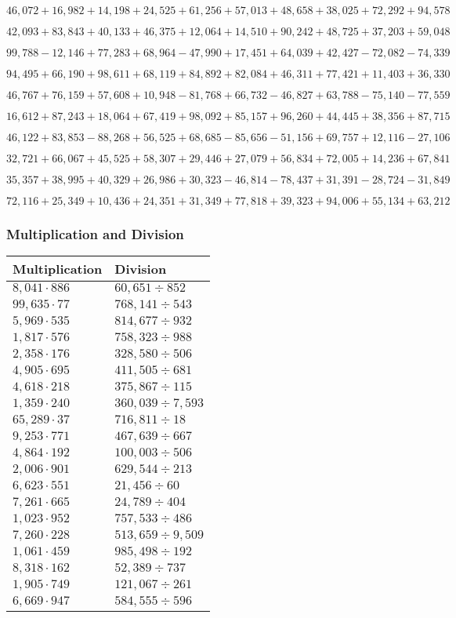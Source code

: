 \(46,072+16,982+14,198+24,525+61,256+57,013+48,658+38,025+72,292+ 94,578\)

\(42,093+83,843+40,133+46,375+12,064+14,510+90,242+48,725+37,203+59,048\)

\(99,788-12,146+77,283+68,964-47,990+17,451+64,039+42,427-72,082-74,339\)

\(94,495+66,190+98,611+68,119+84,892+82,084+46,311+77,421+11,403+36,330\)

\(46,767+76,159+57,608+10,948-81,768+66,732-46,827+63,788-75,140-77,559\)

\(16,612+87,243+18,064+67,419+98,092+85,157+96,260+44,445+38,356+87,715\)

\(46,122+83,853-88,268+56,525+68,685-85,656-51,156+69,757+12,116-27,106\)

\(32,721+66,067+45,525+58,307+29,446+27,079+56,834+72,005+14,236+67,841\)

\(35,357+38,995+40,329+26,986+30,323-46,814-78,437+31,391-28,724-31,849\)

\(72,116+25,349+10,436+24,351+31,349+77,818+39,323+94,006+55,134+63,212\)

\hypertarget{multiplication-and-division-223}{%
\subsubsection{Multiplication and
Division}\label{multiplication-and-division-223}}

\begin{longtable}[]{@{}ll@{}}
\toprule
Multiplication & Division\tabularnewline
\midrule
\endhead
\(8,041\cdot886\) & \(60,651÷852\)\tabularnewline
\(99,635\cdot77\) & \(768,141÷543\)\tabularnewline
\(5,969\cdot535\) & \(814,677÷932\)\tabularnewline
\(1,817\cdot576\) & \(758,323÷988\)\tabularnewline
\(2,358\cdot176\) & \(328,580÷506\)\tabularnewline
\(4,905\cdot695\) & \(411,505÷681\)\tabularnewline
\(4,618\cdot218\) & \(375,867÷115\)\tabularnewline
\(1,359\cdot240\) & \(360,039÷7,593\)\tabularnewline
\(65,289\cdot37\) & \(716,811÷18\)\tabularnewline
\(9,253\cdot771\) & \(467,639÷667\)\tabularnewline
\(4,864\cdot192\) & \(100,003÷506\)\tabularnewline
\(2,006\cdot901\) & \(629,544÷213\)\tabularnewline
\(6,623\cdot551\) & \(21,456÷60\)\tabularnewline
\(7,261\cdot665\) & \(24,789÷404\)\tabularnewline
\(1,023\cdot952\) & \(757,533÷486\)\tabularnewline
\(7,260\cdot228\) & \(513,659÷9,509\)\tabularnewline
\(1,061\cdot459\) & \(985,498÷192\)\tabularnewline
\(8,318\cdot162\) & \(52,389÷737\)\tabularnewline
\(1,905\cdot749\) & \(121,067÷261\)\tabularnewline
\(6,669\cdot947\) & \(584,555÷596\)\tabularnewline
\bottomrule
\end{longtable}

